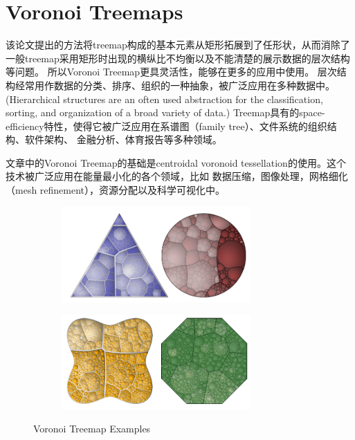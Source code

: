\documentclass{article}
\begin{document}
		\section{Voronoi Treemaps\cite{Balzer2005}}
		该论文提出的方法将treemap构成的基本元素从矩形拓展到了任形状，从而消除了一般treemap采用矩形时出现的横纵比不均衡以及不能清楚的展示数据的层次结构等问题。
		所以Voronoi Treemap更具灵活性，能够在更多的应用中使用。
		层次结构经常用作数据的分类、排序、组织的一种抽象，被广泛应用在多种数据中。
		(Hierarchical structures are an often used abstraction for the classification, 
		sorting, and organization of a broad variety of data.)
		Treemap具有的space-efficiency特性，使得它被广泛应用在系谱图（family tree）、文件系统的组织结构、软件架构、
		金融分析、体育报告等多种领域。

		文章中的Voronoi Treemap的基础是centroidal voronoid tessellation\cite{du1999centroidal}的使用。这个技术被广泛应用在能量最小化的各个领域，比如
		数据压缩，图像处理，网格细化（mesh refinement），资源分配以及科学可视化中。
		\begin{figure}
			\centering
			\begin{subfigure}[h]{0.5\textwidth}
				\includegraphics[width=0.8\textwidth]{_img/VoronoiTreemap_1.png}
				\label{fig:voronoi_treemap_1}
			\end{subfigure}

			\begin{subfigure}[h]{0.5\textwidth}
				\includegraphics[width=0.8\textwidth]{_img/VoronoiTreemap_2.png}
				\label{fig:voronoi_treemap_2}
			\end{subfigure}
			\caption{Voronoi Treemap Examples}
		\end{figure}
\end{document}
